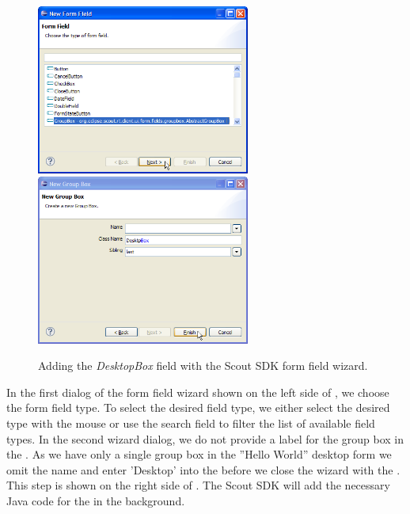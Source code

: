 \documentclass[a4paper,10pt,twoside]{book}
\begin{document}
\begin{figure}
\includegraphics[width=7cm]{sdk_new_field_groupbox_1.png} \hspace{8mm}
\includegraphics[width=7cm]{sdk_new_field_groupbox_2.png}
\caption{Adding the \textit{DesktopBox} field with the Scout SDK form field wizard.}
\end{figure}

In the first dialog of the form field wizard shown on the left side of , we choose the form field type.
To select the desired field type, we either select the desired type with the mouse or use the search field to filter the list of available field types.
In the second wizard dialog, we do not provide a label for the group box in the .
As we have only a single group box in the ''Hello World'' desktop form we omit the name and enter 'Desktop' into the  before we close the wizard with the .
This step is shown on the right side of .
The Scout SDK will add the necessary Java code for the  in the background.
\end{document}
